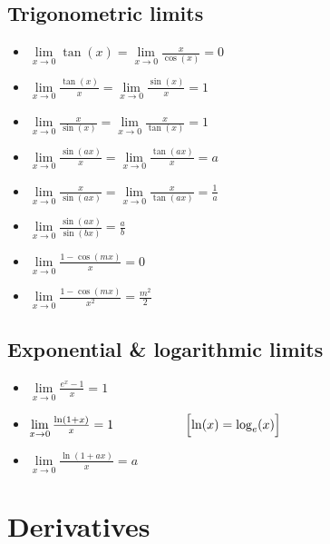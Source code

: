 \documentclass{article}
\begin{document}
\subsection{Trigonometric limits}
\begin{itemize}
  \item $\lim\limits_{x \to 0}\tan(x) =
  \lim\limits_{x \to 0}\frac{x}{\cos(x)} = 0$
  \item $\lim\limits_{x \to 0}\frac{\tan(x)}{x} =
  \lim\limits_{x \to 0}\frac{\sin(x)}{x} = 1$
  \item $\lim\limits_{x \to 0}\frac{x}{\sin(x)} = 
  \lim\limits_{x \to 0}\frac{x}{\tan(x)} = 1$
  \item $\lim\limits_{x \to 0}\frac{\sin(ax)}{x} =
  \lim\limits_{x \to 0}\frac{\tan(ax)}{x} = a$
  \item $\lim\limits_{x \to 0}\frac{x}{\sin(ax)} =
  \lim\limits_{x \to 0}\frac{x}{\tan(ax)} = \frac{1}{a}$
  \item $\lim\limits_{x \to 0}\frac{\sin(ax)}{\sin(bx)} = \frac{a}{b}$
  \item $\lim\limits_{x \to 0}\frac{1 - \cos(mx)}{x} = 0$
  \item $\lim\limits_{x \to 0}\frac{1 - \cos(mx)}{x^2} = \frac{m^2}{2}$
\end{itemize}

\maketitle
\subsection{Exponential \& logarithmic limits}
\begin{itemize}
  \item $\lim\limits_{x \to 0}\frac{e^x - 1}{x} = 1$
  \item $\lim\limits_{x \to 0}\frac{\ln(1+x)}{x} = 1 \hspace{2cm} \Bigl[\ln(x) = \log_e(x)\Bigr] $
  \item $\lim\limits_{x \to 0}\frac{\ln(1 + ax)}{x} = a$
\end{itemize}

\maketitle
\section{Derivatives}
\end{document}
